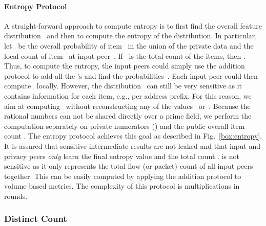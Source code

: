 \documentclass[letterpaper,11pt,onecolumn,titlepage]{article}
\begin{document}
\paragraph{Entropy Protocol}

A straight-forward approach to compute entropy is to first find the
overall feature distribution~ and then to compute the entropy of
the distribution. In particular, let~ be the overall probability
of item~ in the union of the private data and  the local
count of item~ at input peer~. If~ is the total count of the items,
then .  Thus, to compute the
entropy, the input peers could simply use the addition protocol to add all
the 's and find the probabilities~. Each input peer could then
compute~ locally. However, the distribution~ can still be
very sensitive as it contains information for each item, e.g., per 
address prefix. For this reason, we aim at computing~ without
reconstructing any of the values~ or~. 
Because the rational numbers  can not be shared directly over a prime field, we
perform the computation separately on private numerators () and the public
overall item count . The entropy protocol achieves this goal as described in Fig.~\ref{box:entropy}.
It is assured that sensitive intermediate results are
not leaked and that input and privacy peers \emph{only} learn the final
entropy value  and the total count .  is not sensitive as it only 
represents the total flow (or packet) count of all input peers together. This can be easily computed 
by applying the addition protocol to volume-based metrics. 
The complexity of this protocol is  multiplications in  rounds.




\subsubsection{Distinct Count}
\end{document}
